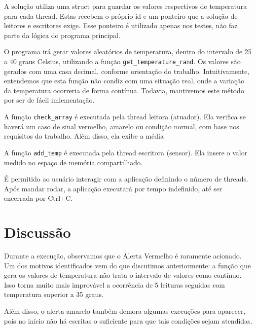 \documentclass[12pt]{article}
\begin{document}
A solução utiliza uma struct para guardar os valores
respectivos de temperatura para cada thread. Estas
recebem o próprio id e um ponteiro que a solução
de leitores e escritores exige. Esse ponteiro é
utilizado apenas nos testes, não faz parte da lógica
do programa principal.

O programa irá gerar valores aleatórios de temperatura,
dentro do intervalo de 25 a 40 graus Celsius,
utilizando a função \texttt{get\_temperature\_rand}.
Os valores são gerados com uma casa decimal, conforme
orientação do trabalho. Intuitivamente, entendemos que
esta função não condiz com uma situação real,
onde a variação da temperatura ocorreria de forma contínua.
Todavia, mantivemos este método por ser de fácil imlementação.

A função \texttt{check\_array} é executada pela thread leitora
(atuador). Ela verifica se haverá
um caso de sinal vermelho, amarelo ou condição normal,
com base nos requisitos do trabalho. Além disso, ela
exibe a média 

A função \texttt{add\_temp} é executada pela thread escritora
(sensor). Ela insere o valor medido no espaço
de memória compartilhado.

É permitido ao usuário interagir com a aplicação
definindo o número de threads. Após mandar rodar,
a aplicação executará por tempo indefinido, até ser encerrada
por Ctrl+C.

\newpage
\section{Discussão}

Durante a execução, observamos que o Alerta Vermelho
é raramente acionado. Um dos motivos identificados
vem do que discutimos anteriormente: a função que
gera os valores de temperatura não trata o intervalo
de valores como contínuo. Isso torna muito mais improvável
a ocorrência de 5 leituras seguidas com temperatura superior
a 35 graus.

Além disso, o alerta amarelo também demora algumas
execuções para aparecer, pois no início não há escritas
o suficiente para que tais condições sejam atendidas.
\end{document}
